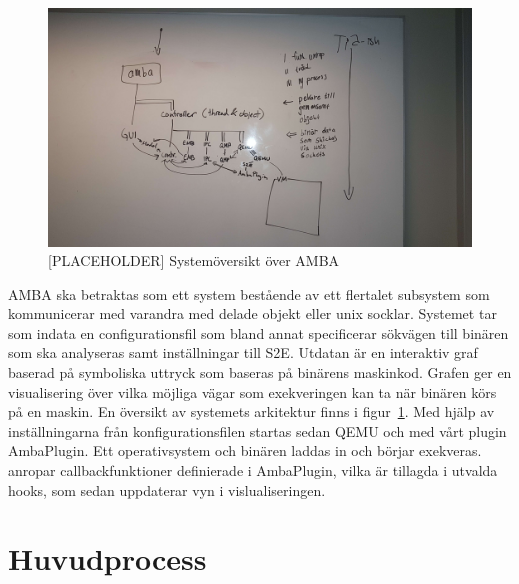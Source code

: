 


\begin{figure}
    \centering
    \includegraphics[width=\textwidth]{figures/arkitektur.jpg}
    \caption{[PLACEHOLDER] Systemöversikt över AMBA}\label{fig:arkitektur}
\end{figure}

%

AMBA ska betraktas som ett system bestående av ett flertalet subsystem som
kommunicerar med varandra med delade objekt eller unix socklar. Systemet tar
som indata en configurationsfil som bland annat specificerar sökvägen till
binären som ska analyseras samt inställningar till S2E. Utdatan är en
interaktiv graf baserad på symboliska uttryck som baseras på binärens maskinkod.
Grafen ger en visualisering över vilka möjliga vägar som exekveringen kan ta när
binären körs på en maskin. En översikt av systemets arkitektur finns i
figur~\ref{fig:arkitektur}. Med hjälp av inställningarna från
konfigurationsfilen startas sedan QEMU och \stoe{} med vårt \stoe{} plugin
AmbaPlugin. Ett operativsystem och binären laddas in och börjar exekveras.
\stoe{} anropar callbackfunktioner definierade i AmbaPlugin, vilka är tillagda i
utvalda \stoe{} hooks, som sedan uppdaterar vyn i vislualiseringen.

\section{Huvudprocess}


